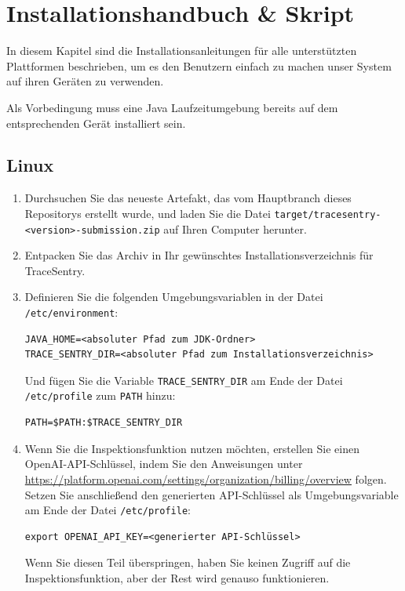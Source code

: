 \documentclass[a4paper,12pt]{report}
\begin{document}
    \section{Installationshandbuch \& Skript}
    In diesem Kapitel sind die Installationsanleitungen für alle unterstützten Plattformen beschrieben, um es
    den Benutzern einfach zu machen unser System auf ihren Geräten zu verwenden.

    Als Vorbedingung muss eine Java Laufzeitumgebung bereits auf dem entsprechenden Gerät installiert sein.

    \subsection{Linux}
    \begin{enumerate}
        \item Durchsuchen Sie das neueste Artefakt, das vom Hauptbranch dieses Repositorys erstellt wurde, und laden Sie die Datei
        \texttt{target/tracesentry-\textless{}version\textgreater{}-submission.zip} auf Ihren Computer herunter.
        \item Entpacken Sie das Archiv in Ihr gewünschtes Installationsverzeichnis für TraceSentry.
        \item Definieren Sie die folgenden Umgebungsvariablen in der Datei \texttt{/etc/environment}:
        \begin{lstlisting}[label={lst:lstlisting-unix-1}]
JAVA_HOME=<absoluter Pfad zum JDK-Ordner>
TRACE_SENTRY_DIR=<absoluter Pfad zum Installationsverzeichnis>
        \end{lstlisting}
        Und fügen Sie die Variable \texttt{TRACE\_SENTRY\_DIR} am Ende der Datei \texttt{/etc/profile} zum \texttt{PATH} hinzu:
        \begin{lstlisting}[label={lst:lstlisting-unix-2}]
PATH=$PATH:$TRACE_SENTRY_DIR
        \end{lstlisting}
        \item Wenn Sie die Inspektionsfunktion nutzen möchten, erstellen Sie einen OpenAI-API-Schlüssel, indem Sie den Anweisungen unter \url{https://platform.openai.com/settings/organization/billing/overview} folgen.
        Setzen Sie anschließend den generierten API-Schlüssel als Umgebungsvariable am Ende der Datei \texttt{/etc/profile}:
        \begin{lstlisting}[label={lst:lstlisting-unix-3}]
export OPENAI_API_KEY=<generierter API-Schlüssel>
        \end{lstlisting}
        Wenn Sie diesen Teil überspringen, haben Sie keinen Zugriff auf die Inspektionsfunktion, aber der Rest wird genauso funktionieren.

\end{enumerate}
\end{document}
